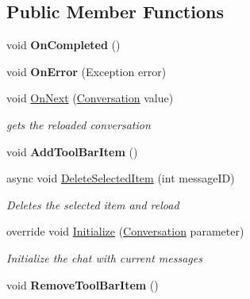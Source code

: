 \subsection*{Public Member Functions}
\begin{DoxyCompactItemize}
\item 
\mbox{\label{class_tutor_scout24_1_1_view_models_1_1_chat_view_model_a23f8ff95f10cb9df7c0bc16575675079}} 
void {\bfseries On\+Completed} ()
\item 
\mbox{\label{class_tutor_scout24_1_1_view_models_1_1_chat_view_model_afc70f8ee9455d3765624d067d693470f}} 
void {\bfseries On\+Error} (Exception error)
\item 
void \mbox{\hyperlink{class_tutor_scout24_1_1_view_models_1_1_chat_view_model_aeec126e30abb6c8b598f2e6654c1b6a9}{On\+Next}} (\mbox{\hyperlink{class_tutor_scout24_1_1_models_1_1_chat_1_1_conversation}{Conversation}} value)
\begin{DoxyCompactList}\small\item\em gets the reloaded conversation \end{DoxyCompactList}\item 
\mbox{\label{class_tutor_scout24_1_1_view_models_1_1_chat_view_model_a0d72982d5dc685381d2ffa5bdb03df65}} 
void {\bfseries Add\+Tool\+Bar\+Item} ()
\item 
async void \mbox{\hyperlink{class_tutor_scout24_1_1_view_models_1_1_chat_view_model_a7e4aeb5984779594082267c2158eec89}{Delete\+Selected\+Item}} (int message\+ID)
\begin{DoxyCompactList}\small\item\em Deletes the selected item and reload \end{DoxyCompactList}\item 
override void \mbox{\hyperlink{class_tutor_scout24_1_1_view_models_1_1_chat_view_model_ad47d924ce1ce699407a990b361813b40}{Initialize}} (\mbox{\hyperlink{class_tutor_scout24_1_1_models_1_1_chat_1_1_conversation}{Conversation}} parameter)
\begin{DoxyCompactList}\small\item\em Initialize the chat with current messages ~\newline
\end{DoxyCompactList}\item 
\mbox{\label{class_tutor_scout24_1_1_view_models_1_1_chat_view_model_a434a4b1fbb043203975b27ae572a12e0}} 
void {\bfseries Remove\+Tool\+Bar\+Item} ()
\end{DoxyCompactItemize}

